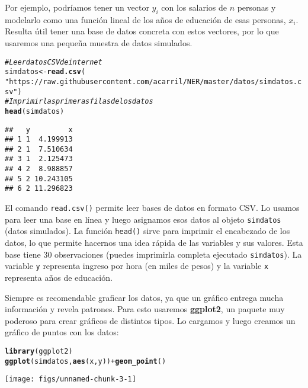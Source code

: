 \documentclass{report}\usepackage[]{graphicx}\usepackage[]{color}
\makeatletter
\newcommand{\hlstr}[1]{\textcolor[rgb]{0.192,0.494,0.8}{#1}}%
\newcommand{\hlcom}[1]{\textcolor[rgb]{0.678,0.584,0.686}{\textit{#1}}}%
\newcommand{\hlopt}[1]{\textcolor[rgb]{0,0,0}{#1}}%
\newcommand{\hlstd}[1]{\textcolor[rgb]{0.345,0.345,0.345}{#1}}%
\newcommand{\hlkwb}[1]{\textcolor[rgb]{0.69,0.353,0.396}{#1}}%
\newcommand{\hlkwd}[1]{\textcolor[rgb]{0.737,0.353,0.396}{\textbf{#1}}}%
\newenvironment{kframe}{%
 \def\at@end@of@kframe{}%
 \ifinner\ifhmode%
  \def\at@end@of@kframe{\end{minipage}}%
  \begin{minipage}{\columnwidth}%
 \fi\fi%
 \def\FrameCommand##1{\hskip\@totalleftmargin \hskip-\fboxsep
 \colorbox{shadecolor}{##1}\hskip-\fboxsep
     \hskip-\linewidth \hskip-\@totalleftmargin \hskip\columnwidth}%
 \MakeFramed {\advance\hsize-\width
   \@totalleftmargin\z@ \linewidth\hsize
   \@setminipage}}%
 {\par\unskip\endMakeFramed%
 \at@end@of@kframe}
\newenvironment{knitrout}{}{} %
\newcommand*{\paq}[1]{\textbf{#1}\index{#1@\textbf{#1}}}
\makeatother
\begin{document}
Por ejemplo, podríamos tener un vector $y_i$ con los salarios de $n$ personas y modelarlo como una función lineal de los años de educación de esas personas, $x_i$. Resulta útil tener una base de datos concreta con estos vectores, por lo que usaremos una pequeña muestra de datos simulados.

\begin{knitrout}
\color{fgcolor}\begin{kframe}
\begin{alltt}
\hlcom{# Leer datos CSV de internet}
\hlstd{simdatos} \hlkwb{<-} \hlkwd{read.csv}\hlstd{(}
  \hlstr{"https://raw.githubusercontent.com/acarril/NER/master/datos/simdatos.csv"}\hlstd{)}
\hlcom{# Imprimir las primeras filas de los datos}
\hlkwd{head}\hlstd{(simdatos)}
\end{alltt}
\begin{verbatim}
##   y         x
## 1 1  4.199913
## 2 1  7.510634
## 3 1  2.125473
## 4 2  8.988857
## 5 2 10.243105
## 6 2 11.296823
\end{verbatim}
\end{kframe}
\end{knitrout}

El comando \verb|read.csv()| permite leer bases de datos en formato CSV. Lo usamos para leer una base en línea y luego asignamos esos datos al objeto \verb|simdatos| (datos simulados). 
La función \verb|head()| sirve para imprimir el encabezado de los datos, lo que permite hacernos una idea rápida de las variables y sus valores.
Esta base tiene 30 observaciones (puedes imprimirla completa ejecutado \verb|simdatos|). La variable \verb|y| representa ingreso por hora (en miles de pesos) y la variable \verb|x| representa años de educación.

Siempre es recomendable graficar los datos, ya que un gráfico entrega mucha información y revela patrones. Para esto usaremos \paq{ggplot2}, un paquete muy poderoso para crear gráficos de distintos tipos. Lo cargamos y luego creamos un gráfico de puntos con los datos:

\begin{knitrout}
\color{fgcolor}\begin{kframe}
\begin{alltt}
\hlkwd{library}\hlstd{(ggplot2)}
\hlkwd{ggplot}\hlstd{(simdatos,} \hlkwd{aes}\hlstd{(x, y))} \hlopt{+} \hlkwd{geom_point}\hlstd{()}
\end{alltt}
\end{kframe}

{\centering \texttt{[image: figs/unnamed-chunk-3-1]} 

}



\end{knitrout}
\end{document}
